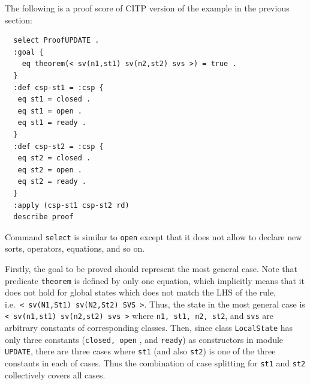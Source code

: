\documentclass[12pt]{report}
\newcommand{\stt}[1]{{\small{\tt {#1}}}}
\begin{document}
The following is a proof score of CITP version of the example in the previous section:
\begin{verbatim}
  select ProofUPDATE .
  :goal {
    eq theorem(< sv(n1,st1) sv(n2,st2) svs >) = true .
  }
  :def csp-st1 = :csp {
   eq st1 = closed .
   eq st1 = open .
   eq st1 = ready .
  }
  :def csp-st2 = :csp {
   eq st2 = closed .
   eq st2 = open .
   eq st2 = ready .
  }
  :apply (csp-st1 csp-st2 rd)
  describe proof
\end{verbatim}
Command {\tt select} is similar to {\tt open} except that it does not
allow to declare new sorts, operators, equations, and so on. 

Firstly, the goal to be proved should represent the most general case.
Note that predicate {\tt theorem} is defined by only one equation,
which implicitly means that it does not hold for global states which
does not match the LHS of the rule,
i.e.\ \stt{<~sv(N1,St1)~sv(N2,St2)~SVS~>}. Thus, the state in the most
general case is \stt{<~sv(n1,st1)~sv(n2,st2)~svs~>} where \stt{n1,
  st1, n2, st2}, and {\tt svs} are arbitrary constants of
corresponding classes.  Then, since class {\tt LocalState} has only
three constants ({\tt closed, open} , and {\tt ready}) as constructors
in module {\tt UPDATE}, there are three cases where {\tt st1} (and
also {\tt st2}) is one of the three constants in each of cases. Thus
the combination of case splitting for {\tt st1} and {\tt st2}
collectively covers all cases.
\end{document}
